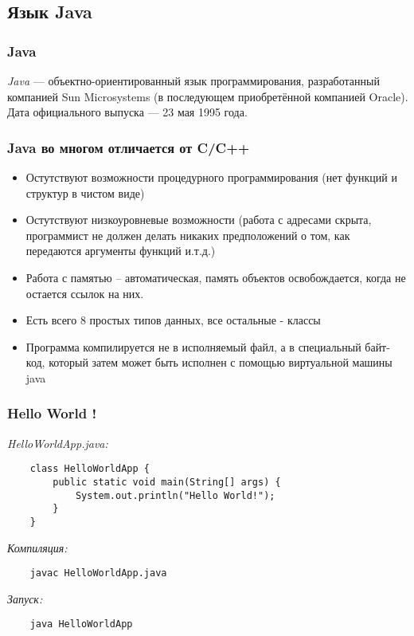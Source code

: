 \subsection{Язык Java}
\begin{frame}
	\frametitle{Java}

	\begin{Large}
	\emph{Java} — объектно-ориентированный язык программирования, разработанный компанией Sun Microsystems (в последующем приобретённой компанией Oracle). Дата официального выпуска — 23 мая 1995 года.
	\end{Large}
\end{frame}

\begin{frame}
	\frametitle{Java во многом отличается от C/C++}

	\begin{itemize}
		\item{Остутствуют возможности процедурного программирования (нет функций и структур в чистом виде)}
		\item{Остутствуют низкоуровневые возможности (работа с адресами скрыта, программист не должен делать никаких предположений о том, как передаются аргументы функций и.т.д.)}
		\item{Работа с памятью -- автоматическая, память объектов освобождается, когда не остается ссылок на них.}
		\item{Есть всего 8 простых типов данных, все остальные - классы}
		\item{Программа компилируется не в исполняемый файл, а в специальный байт-код, который затем может быть исполнен с помощью виртуальной машины java}
	\end{itemize}

\end{frame}


\begin{frame}[fragile]
	\frametitle{Hello World !}

	\begin{large}
	\emph{HelloWorldApp.java:}
	\begin{verbatim}
	class HelloWorldApp {
	    public static void main(String[] args) {
	        System.out.println("Hello World!");
	    }
	}
	\end{verbatim}

	\emph{Компиляция:}
	\begin{verbatim}
	javac HelloWorldApp.java
	\end{verbatim}

	\emph{Запуск:}
	\begin{verbatim}
	java HelloWorldApp
	\end{verbatim}
	\end{large}

\end{frame}


